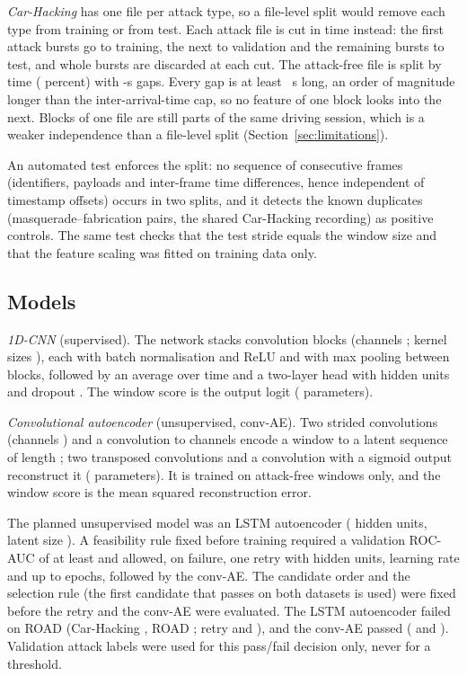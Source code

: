 \emph{Car-Hacking} has one file per attack type, so a file-level split would remove each type from training or from
test. Each attack file is cut in time instead: the first \TrainBursts{} attack bursts go to training, the next
\ValBursts{} to validation and the remaining bursts to test, and \GapBursts{} whole bursts are discarded at each
cut. The attack-free file is split by time (\NormalFractions{} percent) with \NormalGapS-s gaps. Every gap is at
least \MinBlockGapS~s long, an order of magnitude longer than the inter-arrival-time cap, so no feature of one block
looks into the next. Blocks of one file are still parts of the same driving session, which is a weaker
independence than a file-level split (Section~\ref{sec:limitations}).

An automated test enforces the split: no sequence of \LeakNgram{} consecutive frames (identifiers, payloads and
inter-frame time differences, hence independent of timestamp offsets) occurs in two splits, and it detects the
known duplicates (masquerade--fabrication pairs, the shared Car-Hacking recording) as positive controls. The same
test checks that the test stride equals the window size and that the feature scaling was fitted on training data
only.

\subsection{Models}
\emph{1D-CNN} (supervised). The network stacks \CNNBlocks{} convolution blocks (channels \CNNChannels; kernel sizes
\CNNKernels), each with batch normalisation and ReLU and with max pooling between blocks, followed by an average over time and a
two-layer head with \CNNHidden{} hidden units and dropout \CNNDropout. The window score is the output logit
(\CNNParams{} parameters).

\emph{Convolutional autoencoder} (unsupervised, conv-AE). Two strided convolutions (channels \AEChannels) and a
convolution to \AELatentChannels{} channels encode a window to a latent sequence of length \AELatentLen; two
transposed convolutions and a convolution with a sigmoid output reconstruct it (\AEParams{} parameters). It is
trained on attack-free windows only, and the window score is the mean squared reconstruction error.

The planned unsupervised model was an LSTM autoencoder (\LSTMHidden{} hidden units, latent size \LSTMLatent). A
feasibility rule fixed before training required a validation ROC-AUC of at least \FeasMinAUC{} and allowed, on
failure, one retry with \RetryHidden{} hidden units, learning rate \RetryLR{} and up to \RetryMaxEpochs{} epochs,
followed by the conv-AE. The candidate order and the selection rule (the first candidate that passes on both
datasets is used) were fixed before the retry and the conv-AE were evaluated. The LSTM autoencoder failed on ROAD (Car-Hacking \FeasLSTMBaseCH, ROAD \FeasLSTMBaseROAD; retry
\FeasLSTMRetryCH{} and \FeasLSTMRetryROAD), and the conv-AE passed (\FeasConvAECH{} and \FeasConvAEROAD). Validation
attack labels were used for this pass/fail decision only, never for a threshold.

